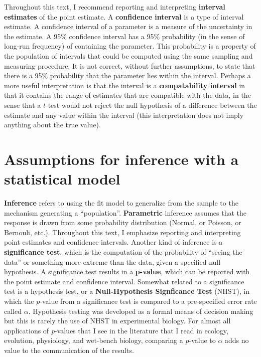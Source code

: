 \documentclass[]{book}
\begin{document}
Throughout this text, I recommend reporting and interpreting \textbf{interval estimates} of the point estimate. A \textbf{confidence interval} is a type of interval estimate. A confidence interval of a parameter is a measure of the uncertainty in the estimate. A 95\% confidence interval has a 95\% probability (in the sense of long-run frequency) of containing the parameter. This probability is a property of the population of intervals that could be computed using the same sampling and measuring procedure. It is not correct, without further assumptions, to state that there is a 95\% probability that the parameter lies within the interval. Perhaps a more useful interpretation is that the interval is a \textbf{compatability interval} in that it contains the range of estimates that are compatible with the data, in the sense that a \(t\)-test would not reject the null hypothesis of a difference between the estimate and any value within the interval (this interpretation does not imply anything about the true value).

\hypertarget{assumptions-for-inference-with-a-statistical-model}{%
\section{Assumptions for inference with a statistical model}\label{assumptions-for-inference-with-a-statistical-model}}

\textbf{Inference} refers to using the fit model to generalize from the sample to the mechanism generating a ``population''. \textbf{Parametric} inference assumes that the response is drawn from some probability distribution (Normal, or Poisson, or Bernouli, etc.). Throughout this text, I emphasize reporting and interpreting point estimates and confidence intervals. Another kind of inference is a \textbf{significance test}, which is the computation of the probability of ``seeing the data'' or something more extreme than the data, given a specified null hypothesis. A significance test results in a \textbf{p-value}, which can be reported with the point estimate and confidence interval. Somewhat related to a significance test is a hypothesis test, or a \textbf{Null-Hypothesis Signficance Test} (NHST), in which the \(p\)-value from a significance test is compared to a pre-specified error rate called \(\alpha\). Hypothesis testing was developed as a formal means of decision making but this is rarely the use of NHST in experimental biology. For almost all applications of \emph{p}-values that I see in the literature that I read in ecology, evolution, physiology, and wet-bench biology, comparing a \(p\)-value to \(\alpha\) adds no value to the communication of the results.
\end{document}
